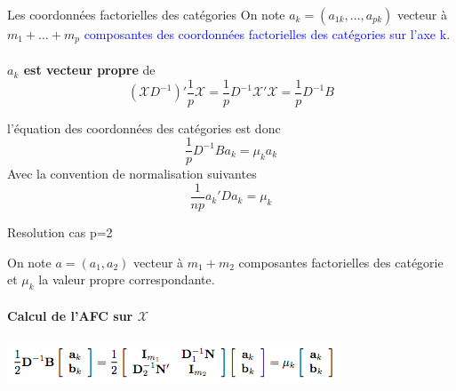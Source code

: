 \documentclass[11pt]{beamer}
\begin{document}
\begin{frame}{Les coordonnées factorielles des catégories}
\centering 
 On note $a_k = (a_{1k}, \ldots , a_{pk})$ vecteur à $m_1 + \ldots + m_p$ \textcolor{blue}{composantes des coordonnées factorielles des catégories sur l'axe k}. \\~\\
 
 
\textbf{$a_k$ est vecteur propre} de $$(\mathcal{X}D^{-1})' \frac{1}{p} \mathcal{X}=\frac{1}{p}{D^{-1}} \mathcal{X}' \mathcal{X}=  \frac{1}{p}{D^{-1}} B$$ 

l’équation des coordonnées des catégories est donc 
 $$\frac{1}{p}{D^{-1}} Ba_k=\mu_k a_k  $$ 
 Avec la convention de normalisation suivantes
  $$\frac{1}{np} {a_k}'Da_k=\mu_k   $$ 

 
 
\end{frame}



\begin{frame}{Resolution cas p=2}
 
\centering 

 On note $a = (a_{1},  a_{2})$ vecteur à $m_1 +  m_2$ composantes   factorielles des catégorie et $\mu_k$ la valeur propre correspondante. \\ \ \\
 

 
 \textbf{Calcul de l'AFC sur $\mathcal{X}$}\\ \ \\
 
 
  \includegraphics[scale=0.8]{AFC1} 
  
 
\end{frame}


\end{document}
